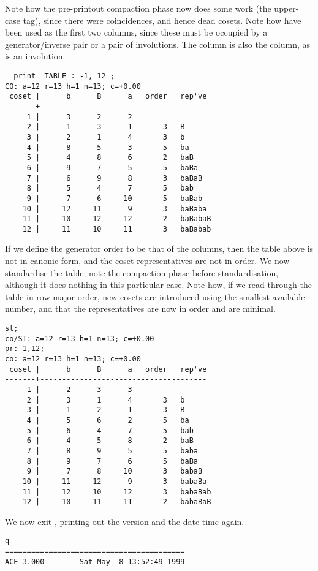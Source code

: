 Note how the pre-printout compaction phase now does some work (the
  upper-case  tag), since there were coincidences, and hence dead
  cosets.
Note how  have been used as the first two columns, since these
  must be occupied by a generator/inverse pair or a pair of involutions.
The  column is also the  column, as  is an
  involution.

\bv\begin{verbatim}
  print  TABLE : -1, 12 ;
CO: a=12 r=13 h=1 n=13; c=+0.00
 coset |      b      B      a   order   rep've
-------+--------------------------------------
     1 |      3      2      2
     2 |      1      3      1       3   B
     3 |      2      1      4       3   b
     4 |      8      5      3       5   ba
     5 |      4      8      6       2   baB
     6 |      9      7      5       5   baBa
     7 |      6      9      8       3   baBaB
     8 |      5      4      7       5   bab
     9 |      7      6     10       5   baBab
    10 |     12     11      9       3   baBaba
    11 |     10     12     12       2   baBabaB
    12 |     11     10     11       3   baBabab
\end{verbatim}\ev

If we define the generator order to be that of the columns, then the table
  above is not in canonic form, and the coset representatives are not in
  order.
We now standardise the table; note the compaction phase before
  standardisation, although it does nothing in this particular case.
Note how, if we read through the table in row-major order, new cosets
  are introduced using the smallest available number, and that the 
  representatives are now in order and are minimal.

\bv\begin{verbatim}
st;
co/ST: a=12 r=13 h=1 n=13; c=+0.00
pr:-1,12;
co: a=12 r=13 h=1 n=13; c=+0.00
 coset |      b      B      a   order   rep've
-------+--------------------------------------
     1 |      2      3      3
     2 |      3      1      4       3   b
     3 |      1      2      1       3   B
     4 |      5      6      2       5   ba
     5 |      6      4      7       5   bab
     6 |      4      5      8       2   baB
     7 |      8      9      5       5   baba
     8 |      9      7      6       5   baBa
     9 |      7      8     10       3   babaB
    10 |     11     12      9       3   babaBa
    11 |     12     10     12       3   babaBab
    12 |     10     11     11       2   babaBaB
\end{verbatim}\ev

We now exit \ace, printing out the version and the date \amp time again.

\bv\begin{verbatim}
q
=========================================
ACE 3.000        Sat May  8 13:52:49 1999
\end{verbatim}\ev


